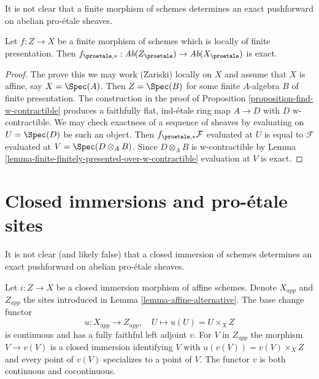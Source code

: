 \noindent
It is not clear that a finite morphism of schemes determines
an exact pushforward on abelian pro-\'etale sheaves.

\begin{lemma}
\label{lemma-finite}
Let $f : Z \to X$ be a finite morphism of schemes which is
locally of finite presentation. Then
$f_{\proetale, *} : \textit{Ab}(Z_\proetale) \to \textit{Ab}(X_\proetale)$
is exact.
\end{lemma}

\begin{proof}
The prove this we may work (Zariski) locally on $X$ and assume that $X$
is affine, say $X = \Spec(A)$. Then $Z = \Spec(B)$ for some finite
$A$-algebra $B$ of finite presentation. The construction in the proof of
Proposition \ref{proposition-find-w-contractible}
produces a faithfully flat, ind-\'etale ring map $A \to D$
with $D$ w-contractible. We may check exactness of a sequence of
sheaves by evaluating on $U = \Spec(D)$ be such an object. Then
$f_{\proetale, *}\mathcal{F}$
evaluated at $U$ is equal to $\mathcal{F}$ evaluated at
$V = \Spec(D \otimes_A B)$. Since $D \otimes_A B$ is w-contractible
by Lemma \ref{lemma-finite-finitely-presented-over-w-contractible}
evaluation at $V$ is exact.
\end{proof}








\section{Closed immersions and pro-\'etale sites}
\label{section-closed-immersion}

\noindent
It is not clear (and likely false) that a closed immersion of schemes
determines an exact pushforward on abelian pro-\'etale sheaves.

\begin{lemma}
\label{lemma-closed-immersion-affines}
Let $i : Z \to X$ be a closed immersion morphism of affine schemes.
Denote $X_{app}$ and $Z_{app}$ the sites introduced in
Lemma \ref{lemma-affine-alternative}.
The base change functor
$$
u : X_{app} \to Z_{app},\quad U \longmapsto u(U) = U \times_X Z
$$
is continuous and has a fully faithful left adjoint $v$.
For $V$ in $Z_{app}$ the morphism $V \to v(V)$ is a closed immersion
identifying $V$ with $u(v(V)) = v(V) \times_X Z$ and every point of
$v(V)$ specializes to a point of $V$.
The functor $v$ is both continuous and cocontinuous.
\end{lemma}

